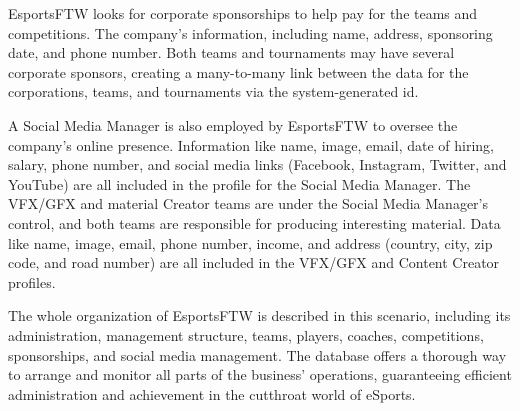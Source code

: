 EsportsFTW looks for corporate sponsorships to help pay for the teams and competitions. The company's information, including name, address, sponsoring date, and phone number. Both teams and tournaments may have several corporate sponsors, creating a many-to-many link between the data for the corporations, teams, and tournaments via the system-generated id.

A Social Media Manager is also employed by EsportsFTW to oversee the company's online presence. Information like name, image, email, date of hiring, salary, phone number, and social media links (Facebook, Instagram, Twitter, and YouTube) are all included in the profile for the Social Media Manager. The VFX/GFX and material Creator teams are under the Social Media Manager's control, and both teams are responsible for producing interesting material. Data like name, image, email, phone number, income, and address (country, city, zip code, and road number) are all included in the VFX/GFX and Content Creator profiles.

The whole organization of EsportsFTW is described in this scenario, including its administration, management structure, teams, players, coaches, competitions, sponsorships, and social media management. The database offers a thorough way to arrange and monitor all parts of the business' operations, guaranteeing efficient administration and achievement in the cutthroat world of eSports.
